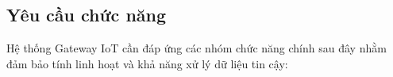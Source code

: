 



    \subsection{Yêu cầu chức năng}
        Hệ thống Gateway IoT cần đáp ứng các nhóm chức năng chính sau đây nhằm đảm bảo tính linh hoạt và khả năng xử lý dữ liệu tin cậy:

